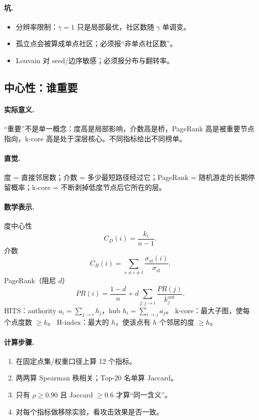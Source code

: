 \paragraph{坑.}
\begin{itemize}
  \item 分辨率限制：\(\gamma=1\) 只是局部最优，社区数随 \(\gamma\) 单调变。
  \item 孤立点会被算成单点社区；必须报“非单点社区数”。
  \item Louvain 对 seed/边序敏感；必须报分布与翻转率。
\end{itemize}

\subsection{中心性：谁重要}

\paragraph{实际意义.}
“重要”不是单一概念：度高是局部影响，介数高是桥，PageRank 高是被重要节点指向，k-core 高是处于深层核心。不同指标给出不同榜单。

\paragraph{直觉.}
度 = 直接邻居数；介数 = 多少最短路径经过它；PageRank = 随机游走的长期停留概率；k-core = 不断剥掉低度节点后它所在的层。

\paragraph{数学表示.}
度中心性
\[
C_D(i)=\frac{k_i}{n-1}.
\]
介数
\[
C_B(i)=\sum_{s\ne i\ne t}\frac{\sigma_{st}(i)}{\sigma_{st}}.
\]
PageRank（阻尼 \(d\)）
\[
PR(i)=\frac{1-d}{n}+d\sum_{j:j\to i}\frac{PR(j)}{k_j^{\mathrm{out}}}.
\]
HITS：authority \(a_i=\sum_{j\to i}h_j\)，hub \(h_i=\sum_{i\to j}a_j\)。
k-core：最大子图，使每个点度数 \(\ge k\)。
H-index：最大的 \(h\)，使该点有 \(h\) 个邻居的度 \(\ge h\)。

\paragraph{计算步骤.}
\begin{enumerate}
  \item 在固定点集/权重口径上算 12 个指标。
  \item 两两算 Spearman 秩相关；Top-20 名单算 Jaccard。
  \item 只有 \(\rho\ge0.90\) 且 Jaccard \(\ge0.6\) 才算“同一含义”。
  \item 对每个指标做移除实验，看攻击效果是否一致。
\end{enumerate}

